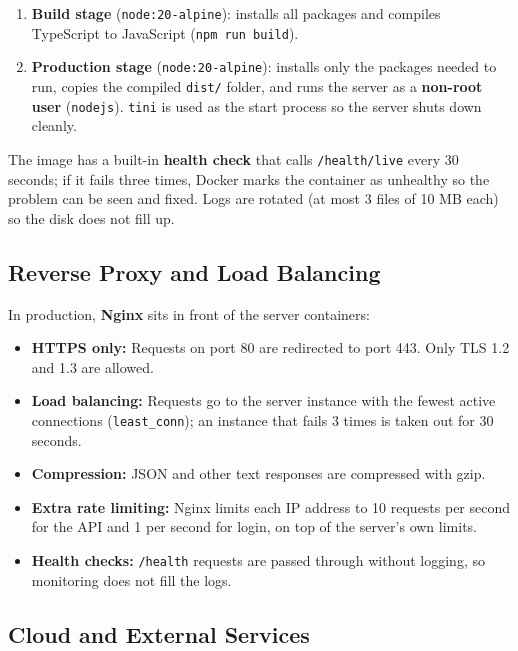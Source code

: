 \begin{enumerate}
  \item \textbf{Build stage} (\texttt{node:20-alpine}): installs all packages
        and compiles TypeScript to JavaScript (\texttt{npm run build}).
  \item \textbf{Production stage} (\texttt{node:20-alpine}): installs only the
        packages needed to run, copies the compiled \texttt{dist/} folder, and
        runs the server as a \textbf{non-root user} (\texttt{nodejs}).
        \texttt{tini} is used as the start process so the server shuts down
        cleanly.
\end{enumerate}

The image has a built-in \textbf{health check} that calls
\texttt{/health/live} every 30 seconds; if it fails three times, Docker marks
the container as unhealthy so the problem can be seen and fixed. Logs are
rotated (at most 3 files of 10 MB each) so the disk does not fill up.

\subsection{Reverse Proxy and Load Balancing}
\label{subsec:nginx}

In production, \textbf{Nginx} sits in front of the server containers:

\begin{itemize}
  \item \textbf{HTTPS only:} Requests on port 80 are redirected to port 443.
        Only TLS 1.2 and 1.3 are allowed.
  \item \textbf{Load balancing:} Requests go to the server instance with the
        fewest active connections (\texttt{least\_conn}); an instance that
        fails 3 times is taken out for 30 seconds.
  \item \textbf{Compression:} JSON and other text responses are compressed
        with gzip.
  \item \textbf{Extra rate limiting:} Nginx limits each IP address to 10
        requests per second for the API and 1 per second for login, on top of
        the server's own limits.
  \item \textbf{Health checks:} \texttt{/health} requests are passed through
        without logging, so monitoring does not fill the logs.
\end{itemize}

\subsection{Cloud and External Services}
\label{subsec:cloud-services}

